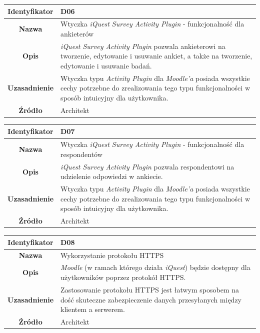 \begin{table}[H]
\centering
\begin{tabular}{ | >{\bfseries}c | p{11cm} | }
\hline
%
Identyfikator & D06 \\ \hline
Nazwa & Wtyczka \textit{iQuest Survey Activity Plugin} - funkcjonalność dla ankieterów  \\ \hline
Opis & \textit{iQuest Survey Activity Plugin} pozwala ankieterowi na tworzenie, edytowanie i usuwanie ankiet, a także na tworzenie, edytowanie i usuwanie badań. \\ \hline
Uzasadnienie & Wtyczka typu \textit{Activity Plugin} dla \textit{Moodle'a} posiada wszystkie cechy potrzebne do zrealizowania tego typu funkcjonalności w sposób intuicyjny dla użytkownika. \\ \hline
Źródło & Architekt \\ \hline
%
\end{tabular}
\end{table}

\begin{table}[H]
\centering
\begin{tabular}{ | >{\bfseries}c | p{11cm} | }
\hline
%
Identyfikator & D07 \\ \hline
Nazwa & Wtyczka \textit{iQuest Survey Activity Plugin} - funkcjonalność dla respondentów \\ \hline
Opis & \textit{iQuest Survey Activity Plugin} pozwala respondentowi na udzielenie odpowiedzi w ankiecie. \\ \hline
Uzasadnienie & Wtyczka typu \textit{Activity Plugin} dla \textit{Moodle'a} posiada wszystkie cechy potrzebne do zrealizowania tego typu funkcjonalności w sposób intuicyjny dla użytkownika. \\ \hline
Źródło & Architekt \\ \hline
%
\end{tabular}
\end{table}

\begin{table}[H]
\centering
\begin{tabular}{ | >{\bfseries}c | p{11cm} | }
\hline
%
Identyfikator & D08 \\ \hline
Nazwa & Wykorzystanie protokołu HTTPS \\ \hline
Opis & \textit{Moodle} (w ramach którego działa \textit{iQuest}) będzie dostępny dla użytkowników poprzez protokół HTTPS. \\ \hline
Uzasadnienie & Zastosowanie protokołu HTTPS jest łatwym sposobem na dość skuteczne zabezpieczenie danych przesyłanych między klientem a serwerem. \\ \hline
Źródło & Architekt \\ \hline
%
\end{tabular}
\end{table}

